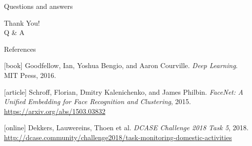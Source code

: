 \begin{frame}{Questions and answers}
    \begin{center}
    {\fontsize{40}{50}\selectfont Thank You! \\[10pt] Q \& A}
    \end{center}
\end{frame}

\begin{frame}[allowframebreaks]{References}
    \begin{thebibliography}{}
        [book]
        Goodfellow, Ian, Yoshua Bengio, and Aaron Courville.
        \newblock \emph{Deep Learning}.
        \newblock MIT Press, 2016.

        [article]
        Schroff, Florian, Dmitry Kalenichenko, and James Philbin.
        \newblock \emph{FaceNet: A Unified Embedding for Face Recognition and Clustering}, 2015.
        \newblock \url{https://arxiv.org/abs/1503.03832}

        [online]
        Dekkers, Lauwereins, Thoen et al.
        \newblock \emph{DCASE Challenge 2018 Task 5}, 2018.
        \newblock \url{http://dcase.community/challenge2018/task-monitoring-domestic-activities}
    \end{thebibliography}
\end{frame}
